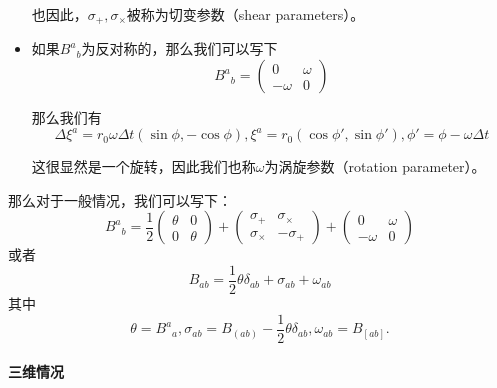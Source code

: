 \documentclass[hyperref, UTF8, a4paper]{ctexart}
\begin{document}
\begin{itemize}
也因此，$\sigma _{+} ,\sigma _{\times }$被称为切变参数（shear parameters）。
\item 如果$B^{a}{}_{b}$为反对称的，那么我们可以写下
\begin{equation*}
	B^{a}{}_{b} =\begin{pmatrix}
		0 & \omega \\
		-\omega  & 0
	\end{pmatrix}
\end{equation*}

那么我们有
\begin{equation*}
	\Delta \xi ^{a} =r_{0} \omega \Delta t(\sin \phi ,-\cos \phi ) ,\xi ^{a} =r_{0}(\cos \phi ',\sin \phi ') ,\phi '=\phi -\omega \Delta t
\end{equation*}

这很显然是一个旋转，因此我们也称$\omega $为涡旋参数（rotation parameter）。
\end{itemize}



那么对于一般情况，我们可以写下：
\begin{equation*}
B^{a}{}_{b} =\frac{1}{2}\begin{pmatrix}
	\theta  & 0\\
	0 & \theta 
\end{pmatrix} +\begin{pmatrix}
	\sigma _{+} & \sigma _{\times }\\
	\sigma _{\times } & -\sigma _{+}
\end{pmatrix} +\begin{pmatrix}
	0 & \omega \\
	-\omega  & 0
\end{pmatrix}
\end{equation*}
或者
\begin{equation*}
B_{ab} =\frac{1}{2} \theta \delta _{ab} +\sigma _{ab} +\omega _{ab}
\end{equation*}
其中
\begin{equation*}
\theta =B^{a}{}_{a} ,\sigma _{ab} =B_{( ab)} -\frac{1}{2} \theta \delta _{ab} ,\omega _{ab} =B_{[ ab]} .
\end{equation*}
\paragraph{三维情况}
\end{document}
